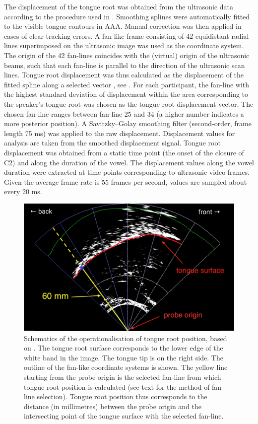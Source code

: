 \documentclass[preprint]{JASAnew}
\begin{document}
The displacement of the tongue root was obtained from the ultrasonic
data according to the procedure used in \citet{kirkham2017}. Smoothing
splines were automatically fitted to the visible tongue contours in AAA.
Manual correction was then applied in cases of clear tracking errors. A
fan-like frame consisting of 42 equidistant radial lines superimposed on
the ultrasonic image was used as the coordinate system. The origin of
the 42 fan-lines coincides with the (virtual) origin of the ultrasonic
beams, such that each fan-line is parallel to the direction of the
ultrasonic scan lines. Tongue root displacement was thus calculated as
the displacement of the fitted spline along a selected vector
\citep{strycharczuk2015}, see . For each participant, the
fan-line with the highest standard deviation of displacement within the
area corresponding to the speaker's tongue root was chosen as the tongue
root displacement vector. The chosen fan-line ranges between fan-line 25
and 34 (a higher number indicates a more posterior position). A
Savitzky--Golay smoothing filter (second-order, frame length 75 ms) was
applied to the raw displacement. Displacement values for analysis are
taken from the smoothed displacement signal. Tongue root displacement
was obtained from a static time point (the onset of the closure of C2)
and along the duration of the vowel. The displacement values along the
vowel duration were extracted at time points corresponding to ultrasonic
video frames. Given the average frame rate is 55 frames per second,
values are sampled about every 20 ms.

\begin{figure}
  \centering
  \includegraphics[width=5in]{Figure1.png}
  \caption{Schematics of the operationalisation of tongue root position, based on \citet{kirkham2017}. The tongue root surface corresponds to the lower edge of the white band in the image. The tongue tip is on the right side. The outline of the fan-like coordinate systems is shown. The yellow line starting from the probe origin is the selected fan-line from which tongue root position is calculated (see text for the method of fan-line selection). Tongue root position thus corresponds to the distance (in millimetres) between the probe origin and the intersecting point of the tongue surface with the selected fan-line.}
  \label{f:trp}
\end{figure}
\end{document}
